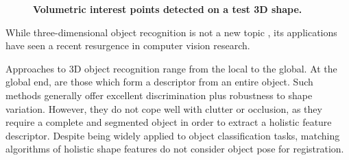 \begin{figure}[t]
\begin{subfigure}[t]{0.30\linewidth}
		\vspace{-5mm} 
		\label{fig/eval/testshapes/fast}
	\end{subfigure}
	\begin{subfigure}[t]{0.30\linewidth} 
		\centering 
		\vspace{-5mm}	
		\label{fig/eval/testshapes/mser}
	\end{subfigure}
	\caption{\label{fig/eval/testshapes} \textbf{Volumetric interest points detected on a test 3D shape.}}
\end{figure}

While three-dimensional object recognition is not a new topic \cite{Fisher1987, Nevatia1977, Marr1978, Bolles1983}, its applications have seen a recent resurgence in computer vision research. 

Approaches to 3D object recognition range from the local to the global. 
At the global end, are those which form a descriptor from an entire object. Such methods generally offer excellent discrimination plus robustness to shape variation. However, they do not cope well with clutter or occlusion, as they require a complete and segmented object in order to extract a holistic feature descriptor. Despite being widely applied to object classification tasks, matching algorithms of holistic shape features do not consider object pose for registration. 

